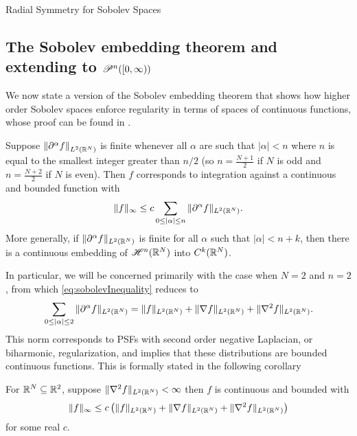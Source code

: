 \begin{chapter}{Radial Symmetry for Sobolev Spaces}
\subsection{The Sobolev embedding theorem and extending to $\mathscr P^n([0,\infty))$}

We now state a version of the Sobolev embedding theorem that shows how higher order Sobolev spaces enforce regularity in terms of spaces of continuous functions, whose proof can be found in \citep{strichartz2003guide}.
\begin{thm} \label{thm:sobolevInequality}
  Suppose $\left\|\partial^\alpha f\right\|_{L^2(\mathbb R^N)}$ is finite whenever all $\alpha$ are such that $|\alpha| <n$ where $n$ is equal to the smallest integer greater than $n/2$ (so $n=\frac{N+1}2$ if $N$ is odd and $n=\frac{N+2}2$ if $N$ is even). Then $f$ corresponds to integration against a continuous and bounded function with
  \begin{equation} \label{eq:sobolevInequality}
    \| f \|_\infty \le c \sum_{0\le |\alpha| \le n}\|\partial^\alpha f\|_{L^2(\mathbb R^N)}.
  \end{equation}
  More generally, if  $\|\partial^\alpha f\|_{L^2(\mathbb R^N)}$ is finite for all $\alpha$ such that $|\alpha| < n + k$, then there is a continuous embedding of $\mathscr H^n(\mathbb R^N)$ into $C^k(\mathbb R^N)$.
\end{thm}

In particular, we will be concerned primarily with the case when $N=2$ and $n=2$, from which \eqref{eq:sobolevInequality} reduces to
\begin{equation}
  \sum_{0\le |\alpha| \le 2}\|\del^\alpha f\|_{L^2(\R^N)} = \|f\|_{L^2(\R^N)} + \|\nabla f\|_{L^2(\R^N)}+ \|\nabla^2 f\|_{L^2(\R^N)}. %
\end{equation}
This norm corresponds to PSFs with second order negative Laplacian, or biharmonic, regularization, and  implies that these distributions are bounded continuous functions.
This is formally stated in the following corollary

\begin{cor} \label{cor:sobolev}
  For $\mathbb R^N \subseteq \mathbb R^2$, suppose $\|\nabla^2 f\|_{L^2(\mathbb R^N)} < \infty$ then $f$ is continuous and bounded with  
  \begin{equation}
    \| f \|_\infty \le c\left(\|f\|_{L^2(\mathbb R^N)} + \| \nabla f\|_{L^2(\mathbb R^N)}+ \| \nabla^2 f\|_{L^2(\mathbb R^N)}\right)
  \end{equation}
  for some real $c$.
\end{cor}


\end{chapter}

